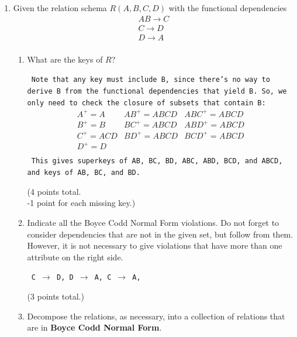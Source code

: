 \documentclass[12pt]{article}
\begin{document}
\begin{enumerate}
\begin{enumerate}
	{\tt (4 points)}
\begin{verbatim}	
  INSERT INTO Stars(name, address) 
         VALUES('Harrison Ford', '123 Maple Street');
  INSERT INTO Stars(name, address) 
         VALUES('Carrie Fisher', '456 Broadway');
\end{verbatim}
\end{enumerate}

\item Given the relation schema $R(A,B,C,D)$ with the functional dependencies
$$
\begin{array}{c}
	AB \rightarrow C\\
	C \rightarrow D\\
	D \rightarrow A\\
\end{array}
$$
\begin{enumerate}
    \item What are the keys of $R$?  
    	{\tt
	Note that any key must include B, since there's no way to derive B from the functional 
	dependencies that yield B.  So, we only need to check the closure of subsets that
	contain B:
	$$
	\begin{array}{lll}
	A^+ = A 		& AB^+ = ABCD & ABC^+ = ABCD\\
	B^+ = B 		& BC^+ = ABCD & ABD^+ = ABCD\\
	C^+ = ACD 	& BD^+ = ABCD & BCD^+ = ABCD\\
	D^+ = D 		 \\	
	\end{array}
	$$
	This gives superkeys of AB, BC, BD, ABC, ABD, BCD, and ABCD, and
	keys of AB, BC, and BD.
	
	(4 points total. \\
	-1 point for each missing key.)
	}
    \item Indicate all the Boyce Codd Normal Form violations.  
	Do not forget to consider
	dependencies that are not in the given set, but follow from them.
	However, it is not necessary to give violations that have more than
	one attribute on the right side.
	
	{\tt
	C $\rightarrow$ D, 
	D $\rightarrow$ A, 
	C $\rightarrow$ A, 

	(3 points total.)
	}
	
    \item Decompose the relations, as necessary, into a collection of 
	relations that are in {\bf Boyce Codd Normal Form}.
	{\tt
	
}
\end{enumerate}
\end{enumerate}
\end{document}
